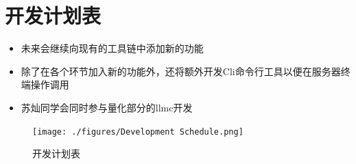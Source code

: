 \documentclass[AutoFakeBold,AutoFakeSlant,language=chinese,degree=bachelor]{sustechthesis}
\begin{document}
\section{开发计划表}
\begin{itemize}
    \item 未来会继续向现有的工具链中添加新的功能
    \item 除了在各个环节加入新的功能外，还将额外开发Cli命令行工具以便在服务器终端操作调用
    \item 苏灿同学会同时参与量化部分的llmc开发
\end{itemize}
\begin{figure}[H]
    \centering
    \texttt{[image: ./figures/Development Schedule.png]}
    \caption{开发计划表}
\end{figure}
\end{document}
